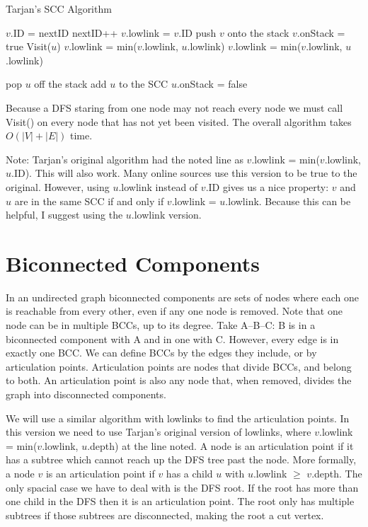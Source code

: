 \documentclass{article}
\begin{document}
\begin{algorithm}[H]
\caption{Tarjan's SCC Algorithm}
\begin{algorithmic}
    \State $v$.ID = nextID
    \State nextID++
    \State $v$.lowlink = $v$.ID
    \State push $v$ onto the stack
    \State $v$.onStack = true
            \State Visit($u$)
            \State $v$.lowlink = min($v$.lowlink, $u$.lowlink)
            \State $v$.lowlink = min($v$.lowlink, $u$.lowlink)
        \EndIf
    \EndFor
    
            \State pop $u$ off the stack
            \State add $u$ to the SCC
            \State $u$.onStack = false
        \EndWhile
    \EndIf
\EndFunction
\end{algorithmic}
\end{algorithm}

Because a DFS staring from one node may not reach every node we must call Visit() on every node that has not yet been visited.  The overall algorithm takes $O(|V| + |E|)$ time.

Note: Tarjan's original algorithm had the noted line as $v$.lowlink = min($v$.lowlink, $u$.ID).  This will also work.  Many online sources use this version to be true to the original.  However, using $u$.lowlink instead of $v$.ID gives us a nice property: $v$ and $u$ are in the same SCC if and only if $v$.lowlink = $u$.lowlink.  Because this can be helpful, I suggest using the $u$.lowlink version.


\section{Biconnected Components}

In an undirected graph biconnected components are sets of nodes where each one is reachable from every other, even if any one node is removed.  Note that one node can be in multiple BCCs, up to its degree.  Take A--B--C:  B is in a biconnected component with A and in one with C.  However, every edge is in exactly one BCC.  We can define BCCs by the edges they include, or by articulation points.  Articulation points are nodes that divide BCCs, and belong to both.  An articulation point is also any node that, when removed, divides the graph into disconnected components.

We will use a similar algorithm with lowlinks to find the articulation points.  In this version we need to use Tarjan's original version of lowlinks, where $v$.lowlink = min($v$.lowlink, $u$.depth) at the line noted.  A node is an articulation point if it has a subtree which cannot reach up the DFS tree past the node.  More formally, a node $v$ is an articulation point if $v$ has a child $u$ with $u$.lowlink $\geq$ $v$.depth.  The only spacial case we have to deal with is the DFS root. If the root has more than one child in the DFS then it is an articulation point.  The root only has multiple subtrees if those subtrees are disconnected, making the root a cut vertex.
\end{document}
